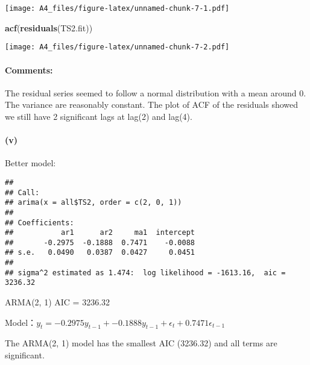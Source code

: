 \documentclass[]{article}
\newenvironment{Shaded}{\begin{snugshade}}{\end{snugshade}}
\newcommand{\CommentTok}[1]{\textcolor[rgb]{0.56,0.35,0.01}{\textit{#1}}}
\newcommand{\DataTypeTok}[1]{\textcolor[rgb]{0.13,0.29,0.53}{#1}}
\newcommand{\DecValTok}[1]{\textcolor[rgb]{0.00,0.00,0.81}{#1}}
\newcommand{\KeywordTok}[1]{\textcolor[rgb]{0.13,0.29,0.53}{\textbf{#1}}}
\newcommand{\NormalTok}[1]{#1}
\newcommand{\OperatorTok}[1]{\textcolor[rgb]{0.81,0.36,0.00}{\textbf{#1}}}
\newcommand{\StringTok}[1]{\textcolor[rgb]{0.31,0.60,0.02}{#1}}
\let\oldparagraph\paragraph
\renewcommand{\paragraph}[1]{\oldparagraph{#1}\mbox{}}
\begin{document}
\texttt{[image: A4\_files/figure-latex/unnamed-chunk-7-1.pdf]}

\begin{Shaded}
\begin{Highlighting}[]
\KeywordTok{acf}\NormalTok{(}\KeywordTok{residuals}\NormalTok{(TS2.fit))}
\end{Highlighting}
\end{Shaded}

\texttt{[image: A4\_files/figure-latex/unnamed-chunk-7-2.pdf]}

\hypertarget{comments-1}{%
\paragraph{Comments:}\label{comments-1}}

The residual series seemed to follow a normal distribution with a mean
around 0. The variance are reasonably constant. The plot of ACF of the
residuals showed we still have 2 significant lags at lag(2) and lag(4).

\hypertarget{v-1}{%
\paragraph{(v)}\label{v-1}}

Better model:

\begin{Shaded}
\end{Shaded}

\begin{verbatim}
## 
## Call:
## arima(x = all$TS2, order = c(2, 0, 1))
## 
## Coefficients:
##           ar1      ar2     ma1  intercept
##       -0.2975  -0.1888  0.7471    -0.0088
## s.e.   0.0490   0.0387  0.0427     0.0451
## 
## sigma^2 estimated as 1.474:  log likelihood = -1613.16,  aic = 3236.32
\end{verbatim}

ARMA(2, 1) AIC = 3236.32

Model：\(y_t = -0.2975y_{t-1} + -0.1888y_{t-1} + \epsilon_t + 0.7471\epsilon_{t-1}\)

The ARMA(2, 1) model has the smallest AIC (3236.32) and all terms are
significant.
\end{document}
